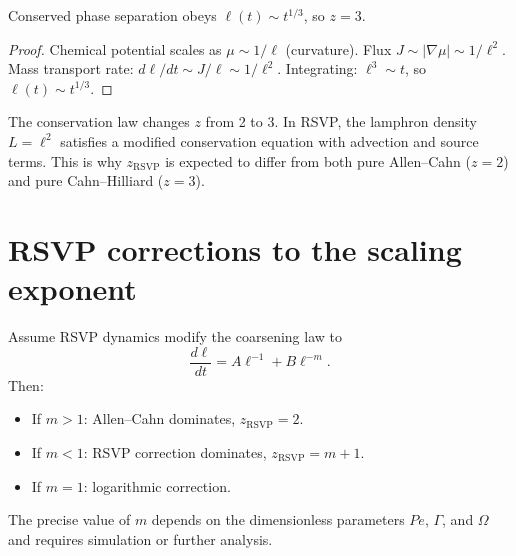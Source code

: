 \begin{theorem}
  \label{thm:ls-scaling}
  Conserved phase separation obeys $\ell(t) \sim t^{1/3}$,
  so $z = 3$.
\end{theorem}

\begin{proof}
  Chemical potential scales as $\mu \sim 1/\ell$ (curvature).
  Flux $J \sim |\nabla\mu| \sim 1/\ell^2$.
  Mass transport rate: $d\ell/dt \sim J/\ell \sim 1/\ell^2$.
  Integrating: $\ell^3 \sim t$, so $\ell(t) \sim t^{1/3}$.
\end{proof}

\begin{TechNote}
  The conservation law changes $z$ from 2 to 3.
  In RSVP, the lamphron density $L = \ell^2$ satisfies a
  modified conservation equation with advection and source
  terms.
  This is why $z_{\mathrm{RSVP}}$ is expected to differ from
  both pure Allen--Cahn ($z=2$) and pure Cahn--Hilliard ($z=3$).
\end{TechNote}

\section{RSVP corrections to the scaling exponent}

\begin{conjecture}
  \label{conj:rsvp-scaling}
  \statusconjectured{}
  Assume RSVP dynamics modify the coarsening law to
  \[
    \frac{d\ell}{dt} = A\ell^{-1} + B\ell^{-m}.
  \]
  Then:
  \begin{itemize}[leftmargin=2em]
    \item If $m > 1$: Allen--Cahn dominates, $z_{\mathrm{RSVP}} = 2$.
    \item If $m < 1$: RSVP correction dominates,
      $z_{\mathrm{RSVP}} = m+1$.
    \item If $m = 1$: logarithmic correction.
  \end{itemize}
\end{conjecture}

The precise value of $m$ depends on the dimensionless
parameters $Pe$, $\Gamma$, and $\Omega$ and requires
simulation or further analysis.

